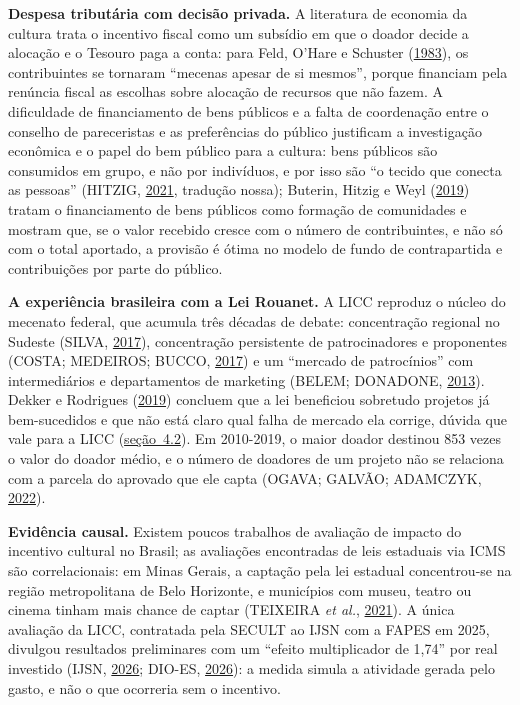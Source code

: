 \documentclass[12pt,a4paper]{article}
\begin{document}
\textbf{Despesa tributária com decisão privada.} A literatura de economia da cultura trata o
incentivo fiscal como um subsídio em que o doador decide a alocação e o Tesouro paga a conta: para
Feld, O'Hare e Schuster (\hyperref[ref-feld-16]{1983}), os contribuintes se tornaram ``mecenas
apesar de si mesmos'', porque financiam pela renúncia fiscal as escolhas sobre alocação de recursos
que não fazem. A dificuldade de financiamento de bens públicos e a falta de coordenação entre o
conselho de pareceristas e as preferências do público justificam a investigação econômica e o papel
do bem público para a cultura: bens públicos são consumidos em grupo, e não por indivíduos, e por
isso são ``o tecido que conecta as pessoas'' (HITZIG, \hyperref[ref-hitzig-21]{2021}, tradução
nossa); Buterin, Hitzig e Weyl (\hyperref[ref-buterin-7]{2019}) tratam o financiamento de bens
públicos como formação de comunidades e mostram que, se o valor recebido cresce com o número de
contribuintes, e não só com o total aportado, a provisão é ótima no modelo de fundo de contrapartida
e contribuições por parte do público.

\textbf{A experiência brasileira com a Lei Rouanet.} A LICC reproduz o núcleo do mecenato federal,
que acumula três décadas de debate: concentração regional no Sudeste (SILVA,
\hyperref[ref-silva-45]{2017}), concentração persistente de patrocinadores e proponentes (COSTA;
MEDEIROS; BUCCO, \hyperref[ref-costa-8]{2017}) e um ``mercado de patrocínios'' com intermediários e
departamentos de marketing (BELEM; DONADONE, \hyperref[ref-belem-2]{2013}). Dekker e Rodrigues
(\hyperref[ref-dekker-9]{2019}) concluem que a lei beneficiou sobretudo projetos já bem-sucedidos e
que não está claro qual falha de mercado ela corrige, dúvida que vale para a LICC (\hyperref[secao-4.2]{seção~4.2}). Em
2010-2019, o maior doador destinou 853 vezes o valor do doador médio, e o número de doadores de um
projeto não se relaciona com a parcela do aprovado que ele capta (OGAVA; GALVÃO; ADAMCZYK,
\hyperref[ref-ogava-27]{2022}).

\textbf{Evidência causal.} Existem poucos trabalhos de avaliação de impacto do incentivo cultural no
Brasil; as avaliações encontradas de leis estaduais via ICMS são correlacionais: em Minas Gerais, a
captação pela lei estadual concentrou-se na região metropolitana de Belo Horizonte, e municípios com
museu, teatro ou cinema tinham mais chance de captar (TEIXEIRA \emph{et al.},
\hyperref[ref-teixeira-46]{2021}). A única avaliação da LICC, contratada pela SECULT ao IJSN com a
FAPES em 2025, divulgou resultados preliminares com um ``efeito multiplicador de 1,74'' por real
investido (IJSN, \hyperref[ref-ijsn-24]{2026}; DIO-ES, \hyperref[ref-dio-es-10]{2026}): a medida
simula a atividade gerada pelo gasto, e não o que ocorreria sem o incentivo.
\end{document}
